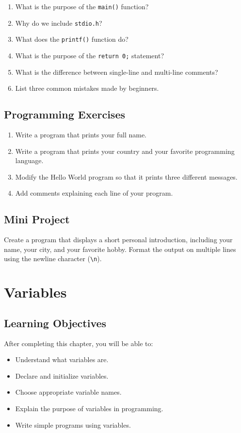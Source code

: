 \documentclass[12pt,openany]{book}
\begin{document}
\begin{enumerate}
    \item What is the purpose of the \texttt{main()} function?
    \item Why do we include \texttt{stdio.h}?
    \item What does the \texttt{printf()} function do?
    \item What is the purpose of the \texttt{return 0;} statement?
    \item What is the difference between single-line and multi-line comments?
    \item List three common mistakes made by beginners.
\end{enumerate}

\section{Programming Exercises}

\begin{enumerate}
    \item Write a program that prints your full name.
    \item Write a program that prints your country and your favorite programming language.
    \item Modify the Hello World program so that it prints three different messages.
    \item Add comments explaining each line of your program.
\end{enumerate}

\section{Mini Project}

Create a program that displays a short personal introduction, including your name, your city, and your favorite hobby. Format the output on multiple lines using the newline character (\texttt{\textbackslash n}).
\chapter{Variables}

\section{Learning Objectives}

After completing this chapter, you will be able to:

\begin{itemize}
    \item Understand what variables are.
    \item Declare and initialize variables.
    \item Choose appropriate variable names.
    \item Explain the purpose of variables in programming.
    \item Write simple programs using variables.
\end{itemize}
\end{document}
